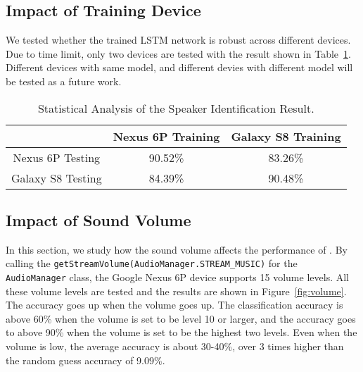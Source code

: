 \subsection{Impact of Training Device}\label{sec:impact:device}
We tested whether the trained LSTM network is robust across different devices. Due to time limit, only two devices are tested with the result shown in Table~\ref{tab:device}. Different devices with same model, and different devies with different model will be tested as a future work.
\begin{table}[!h]
	\caption{Statistical Analysis of the Speaker Identification Result.}
	\label{tab:device}
	\centering	
	\centering
	\begin{tabular}{ccc}
		\toprule[0.5pt]\
		& Nexus 6P Training& Galaxy S8 Training\\
		\midrule[0.5pt]
		Nexus 6P Testing & 90.52\% & 83.26\%\\
		Galaxy S8 Testing & 84.39\% & 90.48\% \\
		\bottomrule[0.5pt]
	\end{tabular}
\end{table}

\subsection{Impact of Sound Volume}\label{sec:impact:volume}
In this section, we study how the sound volume affects the  performance  of {\systemName}. 
%
By calling the \verb|getStreamVolume(AudioManager.STREAM_MUSIC)| for the \verb|AudioManager| class, the Google Nexus 6P device supports 15 volume levels. All these volume levels are tested and the results are shown in Figure~\ref{fig:volume}. 
%
The accuracy goes up when the volume goes up. The classification accuracy is above 60\% when the volume is set to be level 10 or larger, and the accuracy goes to above 90\% when the volume is set to be the highest two levels. Even when the volume is low, the average accuracy is about 30-40\%, over 3 times higher than the random guess accuracy of 9.09\%.

